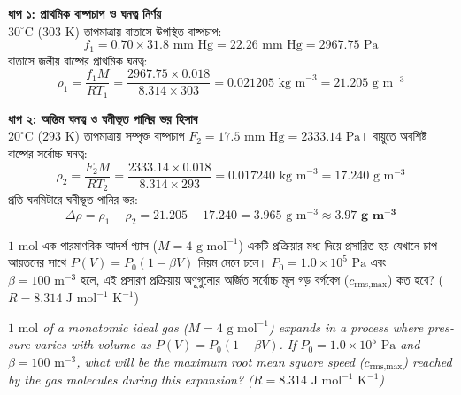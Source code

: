 \documentclass[12pt, a4paper]{article}
\begin{document}
\begin{tcolorbox}[solutionbox={সমাধান (Solution)}]
    \noindent
    \textbf{ধাপ ১: প্রাথমিক বাষ্পচাপ ও ঘনত্ব নির্ণয়} \\
    $30^\circ\text{C}$ ($303\text{ K}$) তাপমাত্রায় বাতাসে উপস্থিত বাষ্পচাপ:
    \[ f_1 = 0.70 \times 31.8\text{ mm Hg} = 22.26\text{ mm Hg} = 2967.75\text{ Pa} \]
    বাতাসে জলীয় বাষ্পের প্রাথমিক ঘনত্ব:
    \[ \rho_1 = \frac{f_1 M}{R T_1} = \frac{2967.75 \times 0.018}{8.314 \times 303} = 0.021205\text{ kg m}^{-3} = 21.205\text{ g m}^{-3} \]
    
    \vspace{0.4em}
    \noindent\textbf{ধাপ ২: অন্তিম ঘনত্ব ও ঘনীভূত পানির ভর হিসাব} \\
    $20^\circ\text{C}$ ($293\text{ K}$) তাপমাত্রায় সম্পৃক্ত বাষ্পচাপ $F_2 = 17.5\text{ mm Hg} = 2333.14\text{ Pa}$। বায়ুতে অবশিষ্ট বাষ্পের সর্বোচ্চ ঘনত্ব:
    \[ \rho_2 = \frac{F_2 M}{R T_2} = \frac{2333.14 \times 0.018}{8.314 \times 293} = 0.017240\text{ kg m}^{-3} = 17.240\text{ g m}^{-3} \]
    প্রতি ঘনমিটারে ঘনীভূত পানির ভর:
    \[ \Delta \rho = \rho_1 - \rho_2 = 21.205 - 17.240 = 3.965\text{ g m}^{-3} \approx \mathbf{3.97\text{ g m}^{-3}} \]
\end{tcolorbox}

\vspace{2em}

\begin{tcolorbox}[questionbox={প্রশ্ন (Question) 12}]
    \noindent
    $1\text{ mol}$ এক-পারমাণবিক আদর্শ গ্যাস ($M = 4\text{ g mol}^{-1}$) একটি প্রক্রিয়ার মধ্য দিয়ে প্রসারিত হয় যেখানে চাপ আয়তনের সাথে $P(V) = P_0 (1 - \beta V)$ নিয়ম মেনে চলে। $P_0 = 1.0 \times 10^5\text{ Pa}$ এবং $\beta = 100\text{ m}^{-3}$ হলে, এই প্রসারণ প্রক্রিয়ায় অণুগুলোর অর্জিত সর্বোচ্চ মূল গড় বর্গবেগ ($c_{\text{rms,max}}$) কত হবে? ($R = 8.314\text{ J mol}^{-1}\text{ K}^{-1}$)
    
    \vspace{0.8em}
    \begin{english}
    \noindent\textit{\color{darkgray}
    $1\text{ mol}$ of a monatomic ideal gas ($M = 4\text{ g mol}^{-1}$) expands in a process where pressure varies with volume as $P(V) = P_0 (1 - \beta V)$. If $P_0 = 1.0 \times 10^5\text{ Pa}$ and $\beta = 100\text{ m}^{-3}$, what will be the maximum root mean square speed ($c_{\text{rms,max}}$) reached by the gas molecules during this expansion? ($R = 8.314\text{ J mol}^{-1}\text{ K}^{-1}$)
    }
    \end{english}
\end{tcolorbox}
\end{document}
